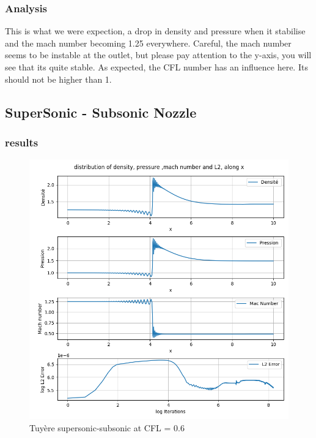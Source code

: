 \documentclass[12pt]{article}
\begin{document}
\subsubsection{Analysis}
This is what we were expection, a drop in density and pressure when it stabilise and the mach number becoming 1.25 everywhere. 
Careful, the mach number seems to be instable at the outlet, but please pay attention to the y-axis, you will see that its quite stable. 
As expected, the CFL number has an influence here. Its should not be higher than 1. 


\subsection{SuperSonic - Subsonic Nozzle}
\subsubsection{results}
\begin{figure}[H] %
    \centering
    \includegraphics[width=\textwidth,height=\textheight,keepaspectratio]{PLOTS/Tuyere_super_sub_Macormack_CFL06.png}
    \caption{Tuyère supersonic-subsonic at CFL = 0.6}
    \label{fig:your_label}
\end{figure}
\end{document}
